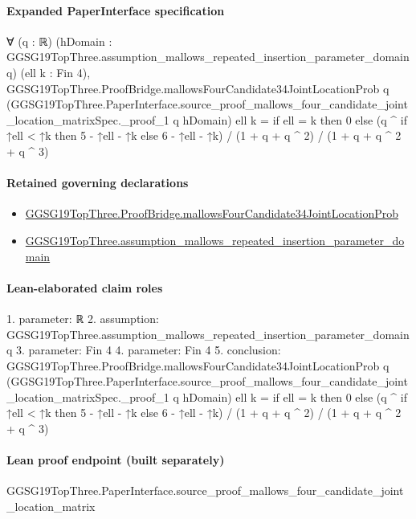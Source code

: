 \documentclass[10pt]{article}
\begin{document}
\paragraph{Expanded PaperInterface specification}
\begin{ReviewVerbatim}
∀ (q : ℝ) (hDomain : GGSG19TopThree.assumption_mallows_repeated_insertion_parameter_domain q) (ell k : Fin 4),
  GGSG19TopThree.ProofBridge.mallowsFourCandidate34JointLocationProb q
      (GGSG19TopThree.PaperInterface.source_proof_mallows_four_candidate_joint_location_matrixSpec._proof_1 q hDomain)
      ell k =
    if ell = k then 0
    else (q ^ if ↑ell < ↑k then 5 - ↑ell - ↑k else 6 - ↑ell - ↑k) / (1 + q + q ^ 2) / (1 + q + q ^ 2 + q ^ 3)
\end{ReviewVerbatim}

\paragraph{Retained governing declarations}
\begin{itemize}\raggedright
\item \hyperlink{governing-declaration-5e7c437f2a878b84}{GGSG19\allowbreak{}Top\allowbreak{}Three.\allowbreak{}Proof\allowbreak{}Bridge.\allowbreak{}mallows\allowbreak{}Four\allowbreak{}Candidate34\allowbreak{}Joint\allowbreak{}Location\allowbreak{}Prob}
\item \hyperlink{paper-prerequisite-6aeda38fed7688bf}{GGSG19\allowbreak{}Top\allowbreak{}Three.\allowbreak{}assumption\_\allowbreak{}mallows\_\allowbreak{}repeated\_\allowbreak{}insertion\_\allowbreak{}parameter\_\allowbreak{}domain}
\end{itemize}
\paragraph{Lean-elaborated claim roles}\begin{ReviewVerbatim}
1. parameter: ℝ
2. assumption: GGSG19TopThree.assumption_mallows_repeated_insertion_parameter_domain q
3. parameter: Fin 4
4. parameter: Fin 4
5. conclusion: GGSG19TopThree.ProofBridge.mallowsFourCandidate34JointLocationProb q
    (GGSG19TopThree.PaperInterface.source_proof_mallows_four_candidate_joint_location_matrixSpec._proof_1 q hDomain) ell
    k =
  if ell = k then 0
  else (q ^ if ↑ell < ↑k then 5 - ↑ell - ↑k else 6 - ↑ell - ↑k) / (1 + q + q ^ 2) / (1 + q + q ^ 2 + q ^ 3)
\end{ReviewVerbatim}

\paragraph{Lean proof endpoint (built separately)}\begin{ReviewVerbatim}
GGSG19TopThree.PaperInterface.source_proof_mallows_four_candidate_joint_location_matrix
\end{ReviewVerbatim}
\end{document}
